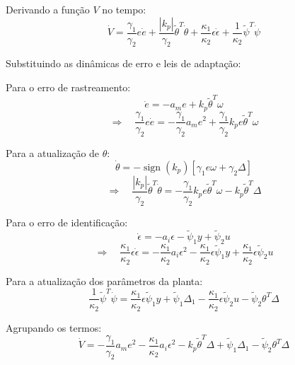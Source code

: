 \documentclass[10pt]{article}
\begin{document}
Derivando a função $V$ no tempo:
\begin{equation}
\dot{V} = \frac{\gamma_1}{\gamma_2} e \dot{e} + \frac{|k_p|}{\gamma_2} \tilde{\theta}^T \dot{\theta} + \frac{\kappa_1}{\kappa_2} \epsilon \dot{\epsilon} + \frac{1}{\kappa_2} \tilde{\psi}^T \dot{\psi}
\end{equation}

Substituindo as dinâmicas de erro e leis de adaptação:

Para o erro de rastreamento:
\begin{equation}
\dot{e} = -a_m e + k_p \tilde{\theta}^T \omega
\end{equation}
\begin{equation}
\Rightarrow \quad
\frac{\gamma_1}{\gamma_2} e \dot{e} = -\frac{\gamma_1}{\gamma_2} a_m e^2 + \frac{\gamma_1}{\gamma_2} k_p e \tilde{\theta}^T \omega
\end{equation}

Para a atualização de $\theta$:
\begin{equation}
\dot{\theta} = -\operatorname{sign}(k_p) \left[\gamma_1 e \omega + \gamma_2 \Delta \right]
\end{equation}
\begin{equation}
\Rightarrow \quad
\frac{|k_p|}{\gamma_2} \tilde{\theta}^T \dot{\theta} = - \frac{\gamma_1}{\gamma_2} k_p e \tilde{\theta}^T \omega - k_p \tilde{\theta}^T \Delta
\end{equation}

Para o erro de identificação:
\begin{equation}
\dot{\epsilon} = -a_i \epsilon - \tilde{\psi}_1 y + \tilde{\psi}_2 u
\end{equation}
\begin{equation}
\Rightarrow \quad
\frac{\kappa_1}{\kappa_2} \epsilon \dot{\epsilon} = -\frac{\kappa_1}{\kappa_2} a_i \epsilon^2 - \frac{\kappa_1}{\kappa_2} \epsilon \tilde{\psi}_1 y + \frac{\kappa_1}{\kappa_2} \epsilon \tilde{\psi}_2 u 
\end{equation}

Para a atualização dos parâmetros da planta:
\begin{equation}
\frac{1}{\kappa_2} \tilde{\psi}^T \dot{\psi} = \frac{\kappa_1}{\kappa_2} \epsilon \tilde{\psi}_1 y + \tilde{\psi}_1 \Delta_1 - \frac{\kappa_1}{\kappa_2} \epsilon \tilde{\psi}_2 u - \tilde{\psi}_2 \theta^T \Delta
\end{equation}

Agrupando os termos:
\begin{equation}
\dot{V} = -\frac{\gamma_1}{\gamma_2} a_m e^2 -\frac{\kappa_1}{\kappa_2} a_i \epsilon^2 - k_p \tilde{\theta}^T \Delta + \tilde{\psi}_1 \Delta_1 - \tilde{\psi}_2 \theta^T \Delta
\end{equation}
\end{document}

